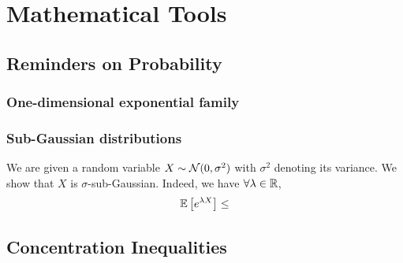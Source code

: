 \chapter{Mathematical Tools}\label{CHAP:MATHS}


\section{Reminders on Probability}\label{app:maths.proba}

\subsection{One-dimensional exponential family}\label{app:maths.proba.exponential}


\subsection{Sub-Gaussian distributions}\label{app:maths.proba.subgaussian}

\begin{definition}

\end{definition}

\begin{example}
	We are given a random variable $X \sim \mathcal{N}(0,\sigma^2)$ with $\sigma^2$ denoting its variance. We show that $X$ is $\sigma$-sub-Gaussian. Indeed, we have $\forall \lambda\in\mathbb{R}$,
	\begin{align*}
		\mathbb{E}\left[e^{\lambda X}\right] &\leq \\
	\end{align*}
\end{example}

\section{Concentration Inequalities}\label{app:maths.concentration}

